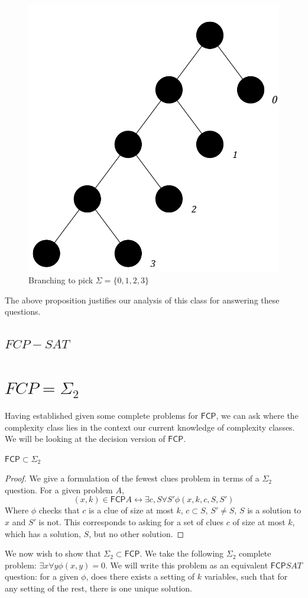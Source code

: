 \documentclass[runningheads,a4paper]{llncs}
\begin{document}
\begin{figure}
\centering
\label{fig:branching}
\includegraphics[width=0.4\linewidth]{branching.pdf}
\caption{Branching to pick $\Sigma = \{ 0, 1, 2, 3 \}$}
\end{figure}

The above proposition justifies our analysis of this class for answering these questions.

\subsection{$FCP-SAT$}

\section{$FCP = \Sigma_2$}

Having established given some complete problems for $\mathsf{FCP}$, we can ask where the complexity class lies in the context our current knowledge of complexity classes. We will be looking at the decision version of $\mathsf{FCP}$. 

\begin{proposition}
\label{prop:fcpsigma2}
$\mathsf{FCP} \subset \Sigma_2$
\end{proposition}

\begin{proof}
We give a formulation of the fewest clues problem in terms of a $\Sigma_2$ question. For a given problem $A$,
\[ (x, k) \in \mathsf{FCP} A \leftrightarrow \exists c, S \forall S' \phi(x, k, c, S, S') \]
Where $\phi$ checks that $c$ is a clue of size at most $k$, $c \subset S$, $S' \neq S$, $S$ is a solution to $x$ and $S'$ is not. This corresponds to asking for a set of clues $c$ of size at most $k$, which has a solution, $S$, but no other solution.  
\end{proof}

We now wish to show that $\Sigma_2 \subset \mathsf{FCP}$. We take the following $\Sigma_2$ complete problem: $\exists x \forall y \phi(x,y) = 0$. We will write this problem as an equivalent $\mathsf{FCP} SAT$ question: for a given $\phi$, does there exists a setting of $k$ variables, such that for any setting of the rest, there is one unique solution.
\end{document}
